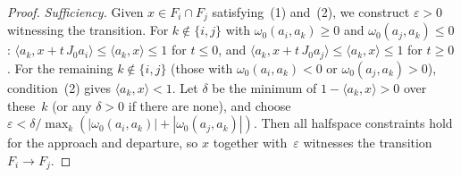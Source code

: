 \begin{unverified}
\begin{proof}
\emph{Sufficiency.}
Given $x \in F_i \cap F_j$ satisfying~(1) and~(2),
we construct $\varepsilon > 0$ witnessing
the transition.
For $k \notin \{i,j\}$ with
$\omega_0(a_i, a_k) \geq 0$ and
$\omega_0(a_j, a_k) \leq 0$:
$\langle a_k, x + t\, J_0 a_i \rangle
\leq \langle a_k, x \rangle \leq 1$
for $t \leq 0$,
and
$\langle a_k, x + t\, J_0 a_j \rangle
\leq \langle a_k, x \rangle \leq 1$
for $t \geq 0$.
For the remaining $k \notin \{i,j\}$
(those with $\omega_0(a_i, a_k) < 0$ or
$\omega_0(a_j, a_k) > 0$),
condition~(2) gives
$\langle a_k, x \rangle < 1$.
Let $\delta$ be the minimum of
$1 - \langle a_k, x \rangle > 0$
over these~$k$ (or any $\delta > 0$ if there are none),
and choose
$\varepsilon < \delta / \max_k(
|\omega_0(a_i, a_k)| + |\omega_0(a_j, a_k)|)$.
Then all halfspace constraints hold for the
approach and departure, so $x$ together
with~$\varepsilon$ witnesses the transition
$F_i \to F_j$.
\end{proof}
\end{unverified}

